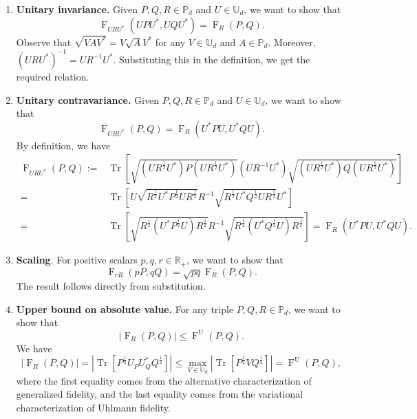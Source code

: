 \documentclass[12pt]{article}
\theoremstyle{definition}
\newcommand{\Fg}[3]{\operatorname{F}_{#3}\!\left(#1, #2\right)}
\begin{document}
\begin{enumerate}[noitemsep, left=0pt]
    \item \textbf{Unitary invariance.} Given $P,Q,R \in \mathbb P_d$ and $U \in \mathbb U_d$, we want to show that
    \begin{equation}
        \Fg{UPU^*}{UQU^*}{URU^*} = \operatorname{F}_R(P,Q). 
    \end{equation}
    Observe that $ \sqrt{VAV^*} = V \sqrt{A} V^*$ for any $ V \in \mathbb U_d$ and $A \in \mathbb P_d$. Moreover, $(U R U^*) ^{-1} = U R ^{-1} U^* $. Substituting this in the definition, we get the required relation.

    \item \textbf{Unitary contravariance.} Given $P,Q,R \in \mathbb P_d$ and $U \in \mathbb U_d$, we want to show that
        \begin{equation}
            \Fg{P}{Q}{URU^*} = \operatorname{F}_R(U^*P U,U^* Q U). 
        \end{equation}
    By definition, we have
    \begin{equation}
    \begin{aligned}
        \operatorname{F}_{U R U^*}(P,Q) := &\operatorname{Tr}\left[\sqrt{(U R ^{\frac12} U^*) P (U R ^{\frac12} U^*)} (U R ^{-1} U^*) \sqrt{(U R ^{\frac12} U^*) Q (U R ^{\frac12} U^*)} \right] \\
        = &\operatorname{Tr} \left[U \sqrt{R ^{\frac12} U^* P^{\frac12}   U R ^{\frac12} } R ^{-1} \sqrt{R ^{\frac12} U^* Q ^{\frac12}  U R ^{\frac12} } U^* \right] \\ 
        = &\operatorname{Tr} \left[\sqrt{R ^{\frac12} \left(U^* P^{\frac12}   U\right) R ^{\frac12} } R ^{-1} \sqrt{R ^{\frac12} \left(U^* Q ^{\frac12}  U\right) R ^{\frac12} } \right]
        = \Fg{U^* P U}{U^* Q U}{R}.
    \end{aligned}
    \end{equation}

    \item \textbf{Scaling}. For positive scalars $p,q,r \in \mathbb R_+$, 
    we want to show that
    \begin{equation}
        \Fg{pP}{qQ}{rR} = \sqrt{pq} \operatorname{F}_R(P,Q). 
    \end{equation}
    The result follows directly from substitution.

    \item \textbf{Upper bound on absolute value.} For any triple $P,Q,R \in \mathbb P_d$, we want to show that
    \begin{equation}
        |\operatorname{F}_R(P,Q)| \leq \operatorname{F}^\mathrm U(P,Q). 
    \end{equation}
    We have
    \begin{equation}
       |\operatorname{F}_R(P,Q)| = \left|\operatorname{Tr}\left[P^{\frac12}  U_P U_Q^* Q ^{\frac12} \right] \right| \leq \max_{V \in \mathbb U_d}\left| \operatorname{Tr} \left[P^{\frac12}  V Q ^{\frac12} \right] \right| = \operatorname{F}^\mathrm U(P,Q),
    \end{equation}
    where the first equality comes from the alternative characterization of generalized fidelity, and the last equality comes from the variational characterization of Uhlmann fidelity. 


\end{enumerate}
\end{document}
